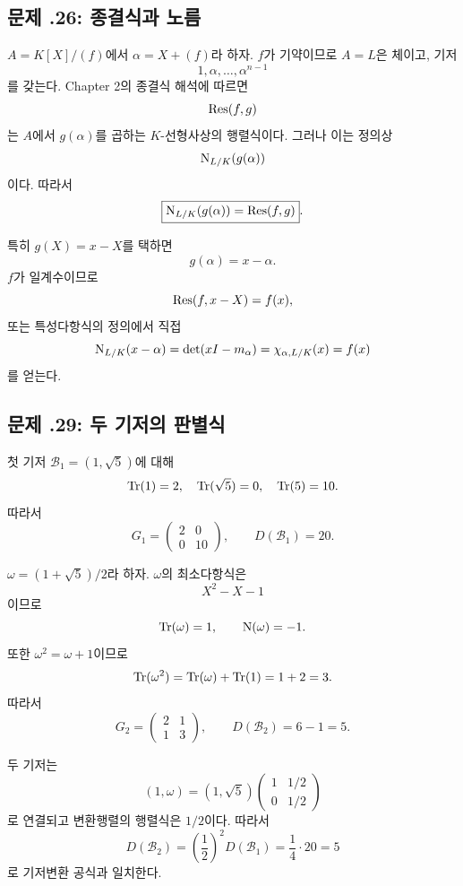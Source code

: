 \subsection*{문제 \thechapter.26: 종결식과 노름}

\begin{solution}
$A=K[X]/(f)$에서 $\alpha=X+(f)$라 하자. $f$가 기약이므로
$A=L$은 체이고, 기저
\[
  1,\alpha,\dots,\alpha^{n-1}
\]
를 갖는다. Chapter 2의 종결식 해석에 따르면
\[
  \operatorname{Res}(f,g)
\]
는 $A$에서 $g(\alpha)$를 곱하는 $K$-선형사상의 행렬식이다.
그러나 이는 정의상
\[
  \operatorname{N}_{L/K}(g(\alpha))
\]
이다. 따라서
\[
  \boxed{
  \operatorname{N}_{L/K}(g(\alpha))=\operatorname{Res}(f,g)}.
\]

특히 $g(X)=x-X$를 택하면
\[
  g(\alpha)=x-\alpha.
\]
$f$가 일계수이므로
\[
  \operatorname{Res}(f,x-X)=f(x),
\]
또는 특성다항식의 정의에서 직접
\[
  \operatorname{N}_{L/K}(x-\alpha)
  =\det(xI-m_\alpha)
  =\chi_{\alpha,L/K}(x)
  =f(x)
\]
를 얻는다.
\end{solution}

\subsection*{문제 \thechapter.29: 두 기저의 판별식}

\begin{solution}
첫 기저 $\mathcal B_1=(1,\sqrt5)$에 대해
\[
  \operatorname{Tr}(1)=2,\quad
  \operatorname{Tr}(\sqrt5)=0,\quad
  \operatorname{Tr}(5)=10.
\]
따라서
\[
  G_1=
  \begin{pmatrix}
    2&0\\
    0&10
  \end{pmatrix},
  \qquad
  D(\mathcal B_1)=20.
\]

$\omega=(1+\sqrt5)/2$라 하자. $\omega$의 최소다항식은
\[
  X^2-X-1
\]
이므로
\[
  \operatorname{Tr}(\omega)=1,\qquad
  \operatorname{N}(\omega)=-1.
\]
또한 $\omega^2=\omega+1$이므로
\[
  \operatorname{Tr}(\omega^2)=\operatorname{Tr}(\omega)+\operatorname{Tr}(1)=1+2=3.
\]
따라서
\[
  G_2=
  \begin{pmatrix}
    2&1\\
    1&3
  \end{pmatrix},
  \qquad
  D(\mathcal B_2)=6-1=5.
\]

두 기저는
\[
  (1,\omega)
  =(1,\sqrt5)
  \begin{pmatrix}
    1&1/2\\
    0&1/2
  \end{pmatrix}
\]
로 연결되고 변환행렬의 행렬식은 $1/2$이다. 따라서
\[
  D(\mathcal B_2)
  =\left(\frac12\right)^2D(\mathcal B_1)
  =\frac14\cdot20=5
\]
로 기저변환 공식과 일치한다.
\end{solution}

